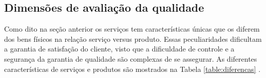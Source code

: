 \subsection{Dimensões de avaliação da qualidade}

Como dito na seção anterior os serviços tem características únicas que os diferem dos bens físicos na relação serviço versus produto. Essas peculiaridades dificultam a garantia de satisfação do cliente, visto que a dificuldade de controle e a segurança da garantia de qualidade são complexas de se assegurar. As diferentes características de serviços e produtos são mostrados na Tabela \ref{table:diferencas} \cite{gronroos1993}.

